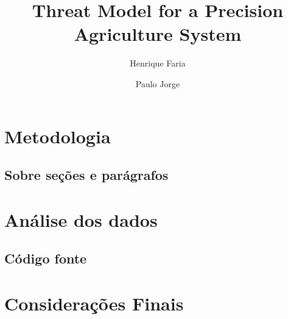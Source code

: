 \documentclass[runningheads]{llncs}
\title{Threat Model for a Precision Agriculture System}
\author{Henrique Faria \and Paulo Jorge}
\institute{Departamento de Informática, Universidade do Minho}
\begin{document}
 

\maketitle

\newpage
\hfill



\section{Metodologia}

\subsection{Sobre seções e parágrafos}

\section{Análise dos dados}\label{sec:analisedosdados}

 




\subsection{Código fonte}





\section{Considerações Finais}




\end{document}
